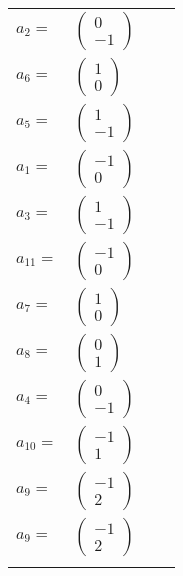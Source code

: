 \documentclass[1p]{elsarticle_modified}
\theoremstyle{definition}
\begin{document}
\begin{tabular}{m{7pt} m{180pt} m{7pt} m{180pt} }
\flushright $a_{2}=$&$\begin{pmatrix}0\\-1\end{pmatrix}$ \\
\flushright $a_{6}=$&$\begin{pmatrix}1\\0\end{pmatrix}$ \\
\flushright $a_{5}=$&$\begin{pmatrix}1\\-1\end{pmatrix}$ \\
\flushright $a_{1}=$&$\begin{pmatrix}-1\\0\end{pmatrix}$ \\
\flushright $a_{3}=$&$\begin{pmatrix}1\\-1\end{pmatrix}$ \\
\flushright $a_{11}=$&$\begin{pmatrix}-1\\0\end{pmatrix}$ \\
\flushright $a_{7}=$&$\begin{pmatrix}1\\0\end{pmatrix}$ \\
\flushright $a_{8}=$&$\begin{pmatrix}0\\1\end{pmatrix}$ \\
\flushright $a_{4}=$&$\begin{pmatrix}0\\-1\end{pmatrix}$ \\
\flushright $a_{10}=$&$\begin{pmatrix}-1\\1\end{pmatrix}$ \\
\flushright $a_{9}=$&$\begin{pmatrix}-1\\2\end{pmatrix}$\\ \flushright $a_{9}=$&$\begin{pmatrix}-1\\2\end{pmatrix}$\\&\end{tabular}
\end{document}
